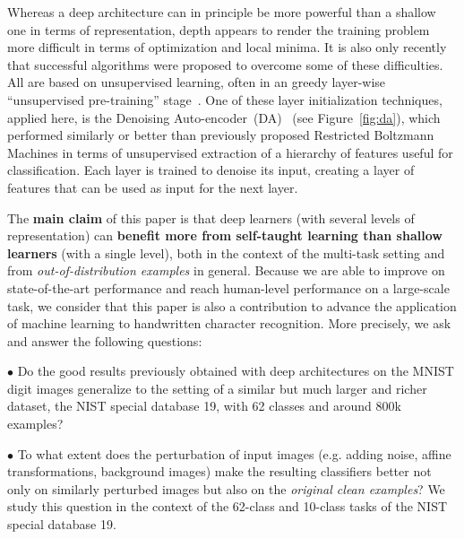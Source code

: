 \documentclass{article} %
\begin{document}
Whereas a deep architecture can in principle be more powerful than a
shallow one in terms of representation, depth appears to render the
training problem more difficult in terms of optimization and local minima.
It is also only recently that successful algorithms were proposed to
overcome some of these difficulties.  All are based on unsupervised
learning, often in an greedy layer-wise ``unsupervised pre-training''
stage~\citep{Bengio-2009}.  One of these layer initialization techniques,
applied here, is the Denoising
Auto-encoder~(DA)~\citep{VincentPLarochelleH2008-very-small} (see Figure~\ref{fig:da}), 
which
performed similarly or better than previously proposed Restricted Boltzmann
Machines in terms of unsupervised extraction of a hierarchy of features
useful for classification. Each layer is trained to denoise its
input, creating a layer of features that can be used as input for the next layer.  


%
The {\bf main claim} of this paper is that deep learners (with several levels of representation) can
{\bf benefit more from self-taught learning than shallow learners} (with a single
level), both in the context of the multi-task setting and from {\em
  out-of-distribution examples} in general. Because we are able to improve on state-of-the-art
performance and reach human-level performance
on a large-scale task, we consider that this paper is also a contribution
to advance the application of machine learning to handwritten character recognition.
More precisely, we ask and answer the following questions:

$\bullet$ %
Do the good results previously obtained with deep architectures on the
MNIST digit images generalize to the setting of a similar but much larger and richer
dataset, the NIST special database 19, with 62 classes and around 800k examples?

$\bullet$ %
To what extent does the perturbation of input images (e.g. adding
noise, affine transformations, background images) make the resulting
classifiers better not only on similarly perturbed images but also on
the {\em original clean examples}? We study this question in the
context of the 62-class and 10-class tasks of the NIST special database 19.
\end{document}
